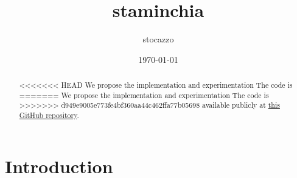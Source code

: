 \documentclass[a4paper, twocolumn, 11pt, twoside]{article}
\title{staminchia}
\author{stocazzo}
\date{\today}
\begin{document}
\maketitle

\begin{abstract}
<<<<<<< HEAD
    We propose the implementation and experimentation The code is
=======
    We propose the implementation and experimentation  The code is
>>>>>>> d949e9005e773fe4bf360aa44c462ffa77b05698
    available publicly at
    \href{https://github.com/neverorfrog/adaptive-pd-ffw-control}{this GitHub
    repository}.
\end{abstract}


\section{Introduction}




\end{document}
